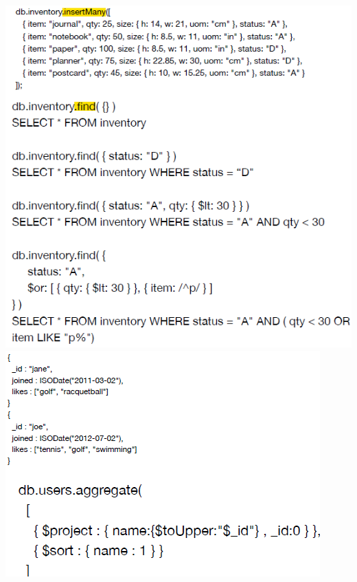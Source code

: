 \documentclass{article}
\begin{document}
\includegraphics[scale=0.5]{20.png}
\includegraphics[scale=0.5]{21.png}\\
\end{document}
